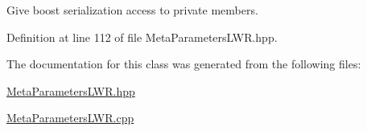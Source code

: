 Give boost serialization access to private members. 



Definition at line 112 of file Meta\+Parameters\+L\+W\+R.\+hpp.



The documentation for this class was generated from the following files\+:\begin{DoxyCompactItemize}
\item 
\hyperlink{MetaParametersLWR_8hpp}{Meta\+Parameters\+L\+W\+R.\+hpp}\item 
\hyperlink{MetaParametersLWR_8cpp}{Meta\+Parameters\+L\+W\+R.\+cpp}\end{DoxyCompactItemize}
